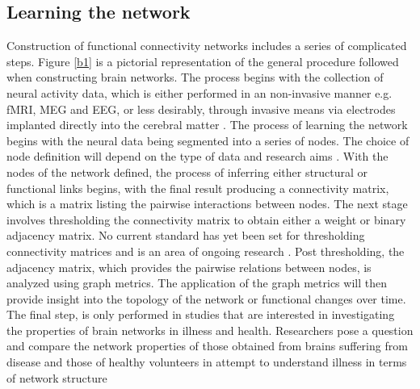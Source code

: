 \documentclass[11pt]{article}
\begin{document}
\subsection{Learning the network}
Construction of functional connectivity networks includes a series of complicated steps. Figure \ref{b1} is a pictorial representation of the general procedure followed when constructing brain networks. The process begins with the collection of neural activity data, which is either performed in an non-invasive manner e.g. fMRI, MEG and EEG, or less desirably, through invasive means via electrodes implanted directly into the cerebral matter \citep{friston}. The process of learning the network begins with the neural data being segmented into a series of nodes. The choice of node definition will depend on the type of data and research aims \citep{stnode}. With the nodes of the network defined, the process of inferring either structural or functional links begins, with the final result producing a connectivity matrix, which is a matrix listing the pairwise interactions between nodes. The next stage involves thresholding the connectivity matrix to obtain either a weight or binary adjacency matrix. No current standard has yet been set for thresholding connectivity matrices and is an area of ongoing research \citep{papo}. Post thresholding, the adjacency matrix, which provides the pairwise relations between nodes, is analyzed using graph metrics. The application of the graph metrics will then provide insight into the topology of the network or functional changes over time. The final step, is only performed in studies that are interested in investigating the properties of brain networks in illness and health. Researchers pose a question and compare the network properties of those obtained from brains suffering from disease and those of healthy volunteers in attempt to understand illness in terms of network structure \citep{fall}
\end{document}
